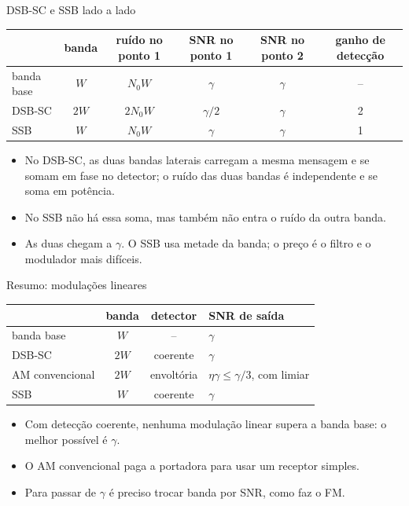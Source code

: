 
\begin{frame}{DSB-SC e SSB lado a lado}

\small
\begin{center}
\begin{tabular}{l c c c c c}
\toprule
 & banda & ruído no ponto 1 & SNR no ponto 1 & SNR no ponto 2 & ganho de detecção \\
\midrule
banda base & $W$ & $N_0W$ & $\gamma$ & $\gamma$ & -- \\
\pause
DSB-SC & $2W$ & $2N_0W$ & $\gamma/2$ & $\gamma$ & 2 \\
\pause
SSB & $W$ & $N_0W$ & $\gamma$ & $\gamma$ & 1 \\
\bottomrule
\end{tabular}
\end{center}

\begin{itemize}
\item<4-> No DSB-SC, as duas bandas laterais carregam a mesma mensagem e se somam em fase no detector; o ruído das duas bandas é independente e se soma em potência.
\item<5-> No SSB não há essa soma, mas também não entra o ruído da outra banda.
\item<6-> As duas chegam a $\gamma$. O SSB usa metade da banda; o preço é o filtro e o modulador mais difíceis.
\end{itemize}

\end{frame}



\begin{frame}{Resumo: modulações lineares}

\small
\begin{center}
\begin{tabular}{l c c l}
\toprule
 & banda & detector & SNR de saída \\
\midrule
banda base & $W$ & -- & $\gamma$ \\
\pause
DSB-SC & $2W$ & coerente & $\gamma$ \\
\pause
AM convencional & $2W$ & envoltória & $\eta\gamma \le \gamma/3$, com limiar \\
\pause
SSB & $W$ & coerente & $\gamma$ \\
\bottomrule
\end{tabular}
\end{center}

\begin{itemize}
\item<5-> Com detecção coerente, nenhuma modulação linear supera a banda base: o melhor possível é $\gamma$.
\item<6-> O AM convencional paga a portadora para usar um receptor simples.
\item<7-> Para passar de $\gamma$ é preciso trocar banda por SNR, como faz o FM.
\end{itemize}

\end{frame}

